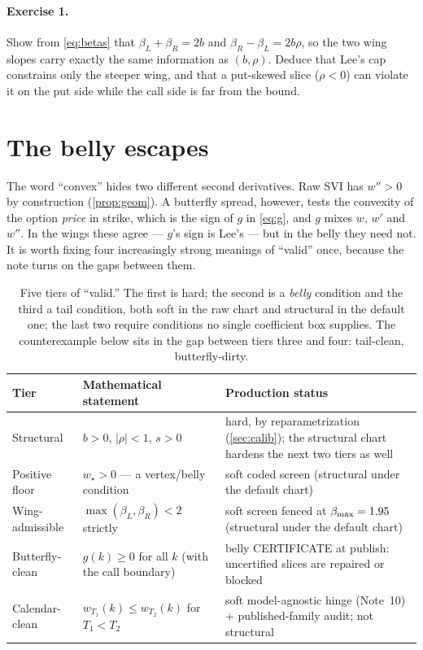 \documentclass[11pt]{article}
\newcommand{\wmin}{w_\star}         %
\newcommand{\betL}{\beta_L}
\newcommand{\betR}{\beta_R}
\begin{document}
\paragraph{Exercise 1.}
Show from \eqref{eq:betas} that $\betL+\betR=2b$ and $\betR-\betL=2b\rho$, so
the two wing slopes carry exactly the same information as $(b,\rho)$.  Deduce
that Lee's cap constrains only the steeper wing, and that a put-skewed slice
($\rho<0$) can violate it on the put side while the call side is far from the
bound.

\section{The belly escapes}
\label{sec:belly}

The word ``convex'' hides two different second derivatives.  Raw SVI has
$w''>0$ by construction (\cref{prop:geom}).  A butterfly spread, however, tests
the convexity of the option \emph{price} in strike, which is the sign of $g$ in
\eqref{eq:g}, and $g$ mixes $w$, $w'$ and $w''$.  In the wings these agree ---
$g$'s sign is Lee's --- but in the belly they need not.  It is worth fixing four
increasingly strong meanings of ``valid'' once, because the note turns on the
gaps between them.

\begin{table}[H]
\centering
\small
\setlength{\tabcolsep}{5pt}
\begin{tabular}{@{}p{}p{}p{}@{}}
\toprule
Tier & Mathematical statement & Production status\\
\midrule
Structural & $b>0$, $|\rho|<1$, $s>0$ & hard, by reparametrization
(\cref{sec:calib}); the structural chart hardens the next two tiers as well\\
Positive floor & $\wmin>0$ --- a vertex/belly condition & soft coded screen
(structural under the default chart)\\
Wing-admissible & $\max(\betL,\betR)<2$ strictly & soft screen fenced at
$\beta_{\max}=1.95$ (structural under the default chart)\\
Butterfly-clean & $g(k)\ge0$ for all $k$ (with the call boundary) & belly
CERTIFICATE at publish: uncertified slices are repaired or blocked\\
Calendar-clean & $w_{T_1}(k)\le w_{T_2}(k)$ for $T_1<T_2$ & soft
model-agnostic hinge (Note~10) + published-family audit; not structural\\
\bottomrule
\end{tabular}
\caption{Five tiers of ``valid.''  The first is hard; the second is a
\emph{belly} condition and the third a tail condition, both soft in the raw
chart and structural in the default one; the last two require conditions no
single coefficient box supplies.  The counterexample below sits in the gap
between tiers three and four: tail-clean, butterfly-dirty.}
\label{tab:tiers}
\end{table}
\end{document}
